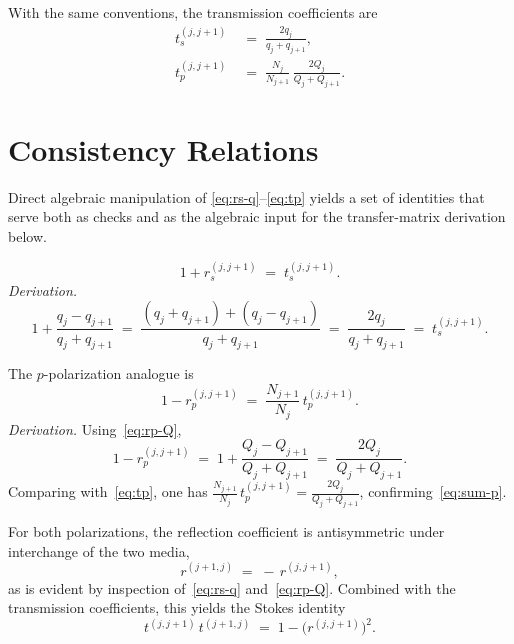 \documentclass[aps,prb,onecolumn,superscriptaddress,nofootinbib,11pt]{revtex4-2}
\begin{document}
With the same conventions, the transmission coefficients are~\cite{Lekner2016}
\begin{align}
  t_s^{(j,j+1)} &\;=\; \frac{2 q_j}{q_j + q_{j+1}},
  \label{eq:ts}\\[4pt]
  t_p^{(j,j+1)} &\;=\; \frac{N_j}{N_{j+1}}\,\frac{2 Q_j}{Q_j + Q_{j+1}}.
  \label{eq:tp}
\end{align}

\section{Consistency Relations}

Direct algebraic manipulation of \eqref{eq:rs-q}--\eqref{eq:tp} yields a set of identities that serve both as checks and as the algebraic input for the transfer-matrix derivation below.

\begin{equation}
  1 + r_s^{(j,j+1)} \;=\; t_s^{(j,j+1)}.
  \label{eq:sum-s}
\end{equation}
\emph{Derivation.}
\begin{equation}
  1 + \frac{q_j - q_{j+1}}{q_j + q_{j+1}} \;=\; \frac{(q_j + q_{j+1}) + (q_j - q_{j+1})}{q_j + q_{j+1}} \;=\; \frac{2 q_j}{q_j + q_{j+1}} \;=\; t_s^{(j,j+1)}.
\end{equation}

The $p$-polarization analogue is
\begin{equation}
  1 - r_p^{(j,j+1)} \;=\; \frac{N_{j+1}}{N_j}\, t_p^{(j,j+1)}.
  \label{eq:sum-p}
\end{equation}
\emph{Derivation.} Using~\eqref{eq:rp-Q},
\begin{equation}
  1 - r_p^{(j,j+1)} \;=\; 1 + \frac{Q_j - Q_{j+1}}{Q_j + Q_{j+1}} \;=\; \frac{2 Q_j}{Q_j + Q_{j+1}}.
\end{equation}
Comparing with~\eqref{eq:tp}, one has $\frac{N_{j+1}}{N_j}\,t_p^{(j,j+1)} = \frac{2Q_j}{Q_j + Q_{j+1}}$, confirming~\eqref{eq:sum-p}.

For both polarizations, the reflection coefficient is antisymmetric under interchange of the two media,
\begin{equation}
  r^{(j+1,j)} \;=\; -\, r^{(j,j+1)},
  \label{eq:reversal}
\end{equation}
as is evident by inspection of~\eqref{eq:rs-q} and~\eqref{eq:rp-Q}. Combined with the transmission coefficients, this yields the Stokes identity
\begin{equation}
  t^{(j,j+1)}\, t^{(j+1,j)} \;=\; 1 - \bigl(r^{(j,j+1)}\bigr)^{2}.
  \label{eq:stokes}
\end{equation}
\end{document}
